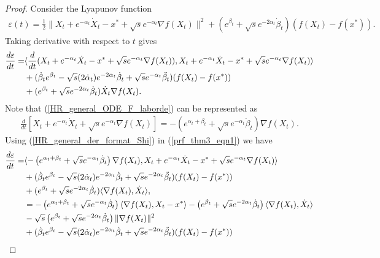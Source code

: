 \documentclass{article}
\theoremstyle{plain}
\theoremstyle{definition}
\theoremstyle{remark}
\begin{document}
\begin{proof}
Consider the Lyapunov function 
\begin{align}\label{lyap_theorem3}
    \varepsilon(t)=\frac{1}{2}\|X_t+e^{-\alpha_t}\dot X_t-x^*+\sqrt{s}e^{-\alpha_t}\nabla f(X_t)\|^2+(e^{\beta_t}+\sqrt{s}e^{-2\alpha_t}\dot \beta_t)(f(X_t)-f(x^*)).
\end{align}
Taking derivative with respect to $t$ gives
\begin{align}\label{prf_thm3_eqn1}
    \frac{d \varepsilon}{dt}=&\langle \frac{d}{dt}(X_t+e^{-\alpha_t}\dot X_t-x^*+\sqrt{s}e^{-\alpha_t}\nabla f(X_t)),X_t+e^{-\alpha_t}\dot X_t-x^*+\sqrt{s}e^{-\alpha_t}\nabla f(X_t)\rangle\nonumber\\
    & +(\dot \beta_te^{\beta_t}-\sqrt{s}(2\dot \alpha_t)e^{-2\alpha_t}\dot \beta_t +\sqrt{s}e^{-\alpha_t}\Ddot{\beta_t})(f(X_t)-f(x^*))\nonumber\\
    &+(e^{\beta_t}+\sqrt{s}e^{-2\alpha_t}\dot \beta_t)\dot X_t\nabla f(X_t).
\end{align}
Note that (\ref{HR_general_ODE_F_laborde}) can be represented as
\begin{align}\label{HR_general_der_format_Shi}
    \frac{d}{dt}\left[X_t+e^{-\alpha_t}\dot X_t+\sqrt{s}e^{-\alpha_t}\nabla f(X_t)\right]=-\left(e^{\alpha_t+\beta_t}+\sqrt{s}e^{-\alpha_t}\dot \beta_t \right)\nabla f(X_t).
\end{align}
Using (\ref{HR_general_der_format_Shi}) in (\ref{prf_thm3_eqn1}) we have
\begin{align}
     \frac{d \varepsilon}{dt}=& \langle -\left(e^{\alpha_t+\beta_t}+\sqrt{s}e^{-\alpha_t}\dot \beta_t \right)\nabla f(X_t),X_t+e^{-\alpha_t}\dot X_t-x^*+\sqrt{s}e^{-\alpha_t}\nabla f(X_t) \rangle \nonumber \\
     &+(\dot \beta_te^{\beta_t}-\sqrt{s}(2\dot \alpha_t)e^{-2\alpha_t}\dot \beta_t +\sqrt{s}e^{-2\alpha_t}\Ddot{\beta_t})(f(X_t)-f(x^*))\nonumber\\
    &+(e^{\beta_t}+\sqrt{s}e^{-2\alpha_t}\dot \beta_t)\langle\nabla f(X_t),\dot X_t\rangle,\nonumber\\
     &= -\left(e^{\alpha_t+\beta_t}+\sqrt{s}e^{-\alpha_t}\dot \beta_t \right)\langle\nabla f(X_t),X_t-x^*\rangle -\left(e^{\beta_t}+\sqrt{s}e^{-2\alpha_t}\dot \beta_t \right)\langle \nabla f(X_t),\dot X_t\rangle \nonumber\\
     &-\sqrt{s}\left(e^{\beta_t}+\sqrt{s}e^{-2\alpha_t}\dot \beta_t \right)\|\nabla f(X_t)\|^2\nonumber\\
     &+(\dot \beta_te^{\beta_t}-\sqrt{s}(2\dot \alpha_t)e^{-2\alpha_t}\dot \beta_t +\sqrt{s}e^{-2\alpha_t}\Ddot{\beta_t})(f(X_t)-f(x^*))\nonumber\\

\end{align}
\end{proof}
\end{document}

